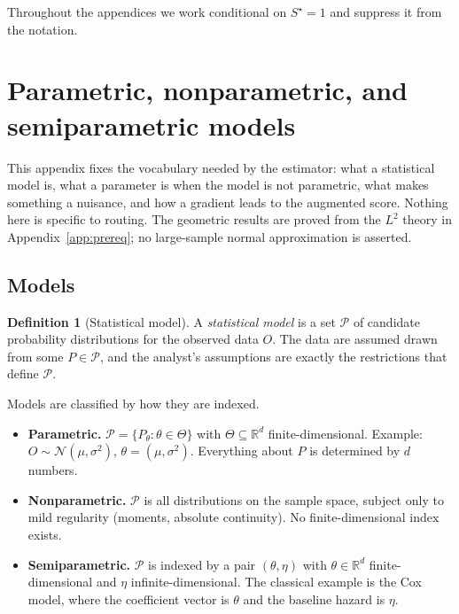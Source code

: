 \documentclass[11pt,a4paper]{article}
\theoremstyle{plain}
\theoremstyle{definition}
\newtheorem{definition}[theorem]{Definition}
\theoremstyle{remark}
\newcommand{\Sstar}{S^{\star}}
\begin{document}
Throughout the appendices we work conditional on $\Sstar=1$ and suppress it from the notation.

\section{Parametric, nonparametric, and semiparametric models}\label{app:semipar}

This appendix fixes the vocabulary needed by the estimator: what a statistical model is, what a
parameter is when the model is not parametric, what makes something a nuisance, and how a
gradient leads to the augmented score. Nothing here is specific to routing. The geometric
results are proved from the $L^2$ theory in Appendix~\ref{app:prereq}; no large-sample normal
approximation is asserted.

\subsection{Models}

\begin{definition}[Statistical model]\label{def:model}
A \emph{statistical model} is a set $\mathcal P$ of candidate probability distributions for
the observed data $O$. The data are assumed drawn from some $P\in\mathcal P$, and the
analyst's assumptions are exactly the restrictions that define $\mathcal P$.
\end{definition}

Models are classified by how they are indexed.

\begin{itemize}[leftmargin=*]
\item \textbf{Parametric.} $\mathcal P=\{P_\theta:\theta\in\Theta\}$ with
$\Theta\subseteq\mathbb R^d$ finite-dimensional. Example: $O\sim\mathcal N(\mu,\sigma^2)$,
$\theta=(\mu,\sigma^2)$. Everything about $P$ is determined by $d$ numbers.
\item \textbf{Nonparametric.} $\mathcal P$ is all distributions on the sample space, subject
only to mild regularity (moments, absolute continuity). No finite-dimensional index exists.
\item \textbf{Semiparametric.} $\mathcal P$ is indexed by a pair $(\theta,\eta)$ with
$\theta\in\mathbb R^d$ finite-dimensional and $\eta$ infinite-dimensional. The classical
example is the Cox model, where the coefficient vector is $\theta$ and the baseline hazard is
$\eta$.
\end{itemize}
\end{document}
